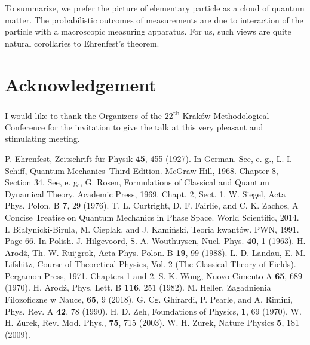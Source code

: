 \documentclass[12pt]{article}
\begin{document}
 To summarize, we prefer the picture of elementary particle as a cloud of quantum matter. The probabilistic outcomes of measurements are due to interaction of the particle with a macroscopic measuring apparatus. For us, such views are quite natural corollaries to Ehrenfest's theorem. 



\section{Acknowledgement}
I would like to thank the Organizers of the 22\textsuperscript{th} Krak\'ow Methodological Conference for the invitation to give the talk at this very pleasant and stimulating meeting. 



 


\begin{thebibliography}{99}
 P. Ehrenfest, Zeitschrift f\"ur Physik {\bf 45}, 455 (1927). In German.
 See, e. g., L. I. Schiff, Quantum Mechanics--Third Edition. McGraw-Hill, 1968. Chapter 8, Section 34. 
 See, e. g., G. Rosen, Formulations of Classical and Quantum Dynamical Theory. Academic Press, 1969. Chapt. 2, Sect. 1. 
 W. Siegel, Acta Phys. Polon. B {\bf 7}, 29 (1976). 
 T. L. Curtright, D. F. Fairlie, and C. K. Zachos, A Concise Treatise on Quantum Mechanics in Phase Space. World Scientific, 2014. 
 I. Bia\l{}ynicki-Birula, M. Cieplak, and J. Kami\'nski, Teoria kwant\'ow. PWN, 1991. Page 66. In Polish. 
 J. Hilgevoord, S. A. Wouthuysen, Nucl. Phys. {\bf 40}, 1 (1963).
 H. Arod\'z, Th. W. Ruijgrok, Acta Phys. Polon. B {\bf 19}, 99 (1988).
 L. D. Landau, E. M. Lifshitz, Course of Theoretical Physics, Vol. 2 (The Classical Theory of Fields). Pergamon Press, 1971. Chapters 1 and 2. 
 S. K. Wong, Nuovo Cimento A {\bf 65}, 689 (1970). 
 H. Arod\'z, Phys. Lett. B {\bf 116}, 251 (1982).
 M. Heller, Zagadnienia Filozoficzne w Nauce, {\bf 65}, 9 (2018). 
 G. Cg. Ghirardi, P. Pearle, and A. Rimini, Phys. Rev. A {\bf 42}, 78 (1990). 
 H. D. Zeh, Foundations of Physics, {\bf 1}, 69 (1970).
 W. H. \.Zurek, Rev. Mod. Phys., {\bf 75}, 715 (2003). 
 W. H. \.Zurek, Nature Physics {\bf 5}, 181 (2009). 

\end{thebibliography}
\end{document}
